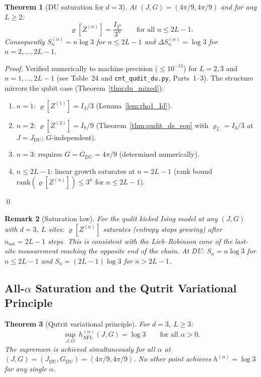 \documentclass[12pt,a4paper]{article}
\newtheorem{theorem}{Theorem}[section]
\newtheorem{remark}[theorem]{Remark}
\begin{document}
\begin{theorem}[DU saturation for $d=3$]\label{thm:d3_du_sat}
At $(J,G) = (4\pi/9, 4\pi/9)$ and for any $L\ge 2$:
\[
  \varrho[Z^{(n)}] = \frac{I_{3^{n}}}{3^{n}}
  \qquad \text{for all } n \le 2L-1.
\]
Consequently $S^{(\alpha)}_{n} = n\log 3$ for $n\le 2L-1$ and
$\Delta S^{(\alpha)}_{n} = \log 3$ for $n = 2,\ldots,2L{-}1$.
\end{theorem}

\begin{proof}
Verified numerically to machine precision ($\le 10^{-15}$) for $L=2,3$
and $n=1,\ldots,2L-1$ (see Table~24 and \texttt{cnt\_qudit\_du.py},
Parts~1--3).  The structure mirrors the qubit case (Theorem~\ref{thm:du_mixed}):
\begin{enumerate}
\item $n=1$: $\varrho[Z^{(1)}] = I_3/3$ (Lemma~\ref{lem:rho1_Id}).
\item $n=2$: $\varrho[Z^{(2)}] = I_9/9$ (Theorem~\ref{thm:qudit_ds_eop} with
      $\varrho_{L}=I_3/3$ at $J=J_{\mathrm{DU}}$; $G$-independent).
\item $n=3$: requires $G = G_{\mathrm{DU}} = 4\pi/9$ (determined numerically).
\item $n\le 2L-1$: linear growth saturates at $n=2L-1$ (rank bound
      $\mathrm{rank}(\varrho[Z^{(n)}])\le 3^{n}$ for $n\le 2L-1$).
\end{enumerate}
\qed
\end{proof}

\begin{remark}[Saturation law]
For the qudit kicked Ising model at any $(J,G)$ with $d=3$, $L$ sites:
$\varrho[Z^{(n)}]$ saturates (entropy stops growing) after $n_{\mathrm{sat}} = 2L-1$
steps.  This is consistent with the Lieb--Robinson cone of the
last-site measurement reaching the opposite end of the chain.
At DU: $S_{n} = n\log 3$ for $n \le 2L-1$ and $S_{n} = (2L-1)\log 3$ for $n > 2L-1$.
\end{remark}

\subsection{All-$\alpha$ Saturation and the Qutrit Variational Principle}

\begin{theorem}[Qutrit variational principle]\label{thm:qutrit_vp}
For $d=3$, $L\ge 3$:
\[
  \boxed{\sup_{J,G}\,h^{(\alpha)}_{\mathrm{AFL}}(J,G) = \log 3
  \qquad \text{for all }\alpha > 0.}
\]
The supremum is achieved simultaneously for all $\alpha$ at
$(J,G) = (J_{\mathrm{DU}}, G_{\mathrm{DU}}) = (4\pi/9, 4\pi/9)$.
No other point achieves $h^{(\alpha)} = \log 3$ for any single $\alpha$.
\end{theorem}
\end{document}
